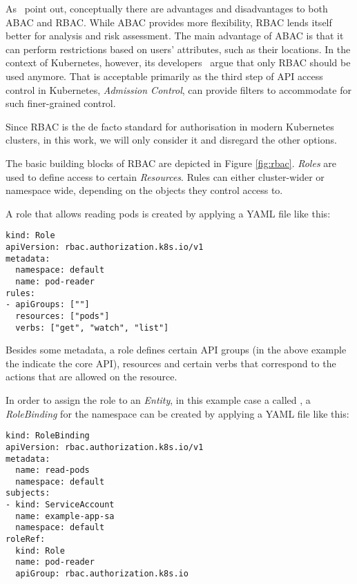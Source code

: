 As~\textcite{ABACvsRBAC} point out, conceptually there are advantages and disadvantages to both ABAC and RBAC. While ABAC provides more flexibility, RBAC lends itself better for analysis and risk assessment. The main advantage of ABAC is that it can perform restrictions based on users' attributes, such as their locations. In the context of Kubernetes, however, its developers~\textcite{ABACvsRBACk8s} argue that only RBAC should be used anymore. That is acceptable primarily as the third step of API access control in Kubernetes, \textit{Admission Control}, can provide filters to accommodate for such finer-grained control.

Since RBAC is the de facto standard for authorisation in modern Kubernetes clusters, in this work, we will only consider it and disregard the other options.


The basic building blocks of RBAC are depicted in Figure \ref{fig:rbac}. \textit{Roles} are used to define access to certain \textit{Resources}. Rules can either cluster-wider or namespace wide, depending on the objects they control access to.

A role that allows reading pods is created by applying a YAML file like this: 

\begin{lstlisting}[frame=single]
kind: Role
apiVersion: rbac.authorization.k8s.io/v1
metadata:
  namespace: default
  name: pod-reader
rules:
- apiGroups: [""]
  resources: ["pods"]
  verbs: ["get", "watch", "list"]
\end{lstlisting}

Besides some metadata, a role defines certain API groups (in the above example the  indicate the core API), resources and certain verbs that correspond to the actions that are allowed on the resource. 

In order to assign the role to an \textit{Entity}, in this example case a  called , a \textit{RoleBinding} for the namespace  can be created by applying a YAML file like this:

\begin{lstlisting}[frame=single]
kind: RoleBinding
apiVersion: rbac.authorization.k8s.io/v1
metadata:
  name: read-pods
  namespace: default
subjects:
- kind: ServiceAccount
  name: example-app-sa 
  namespace: default
roleRef:
  kind: Role
  name: pod-reader
  apiGroup: rbac.authorization.k8s.io
\end{lstlisting}

